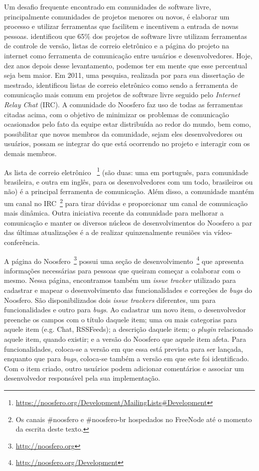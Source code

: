Um desafio frequente encontrado em comunidades de software livre, principalmente
comunidades de projetos menores ou novos, é elaborar um processo e utilizar
ferramentas que facilitem e incentivem a entrada de novas pessoas. 
 identificou que 65\% dos projetos de software livre
utilizam ferramentas de controle de versão, listas de correio eletrônico e a
página do projeto na internet como ferramenta de comunicação entre usuários e
desenvolvedores. Hoje, dez anos depois desse levantamento, podemos ter em mente
que esse percentual seja bem maior.
%
Em 2011, uma pesquisa, realizada por 
para sua dissertação de mestrado, identificou listas de correio eletrônico como
sendo a ferramenta de comunicação mais comum em projetos de software livre
seguido pelo \textit{Internet Relay Chat} (IRC).
%
A comunidade do Noosfero faz uso de todas as ferramentas citadas acima, com
o objetivo de minimizar os problemas de comunicação ocasionados pelo fato da
equipe estar distribuída ao redor do mundo, bem como, possibilitar que novos
membros da comunidade, sejam eles desenvolvedores ou usuários, possam se
integrar do que está ocorrendo no projeto e interagir com os demais membros.

As lista de correio eletrônico
~\footnote{\url{https://noosfero.org/Development/MailingLists\#Development}}
(são duas: uma em português, para comunidade brasileira, e outra em inglês,
para os desenvolvedores com um todo, brasileiros ou não) é a principal
ferramenta de comunicação. 
%
Além disso, a comunidade mantém um canal no IRC~\footnote{Os canais \#noosfero e
\#noosfero-br hospedados no FreeNode até o momento da escrita deste texto.}
para tirar dúvidas e proporcionar um canal de comunicação mais dinâmica.
%
Outra iniciativa recente da comunidade para melhorar a comunicação e manter os
diversos núcleos de desenvolvimentos do Noosfero a par das últimas atualizações
é a de realizar quinzenalmente reuniões via vídeo-conferência.

A página do Noosfero~\footnote{\url{http://noosfero.org}} possui uma seção de
desenvolvimento~\footnote{\url{http://noosfero.org/Development}} que apresenta
informações necessárias para pessoas que queiram começar a colaborar com o
mesmo. Nessa página, encontramos também um \textit{issue tracker} utilizado para
cadastrar e mapear o desenvolvimento das funcionalidades e correções de
\textit{bugs} do Noosfero.
%
São disponibilizados dois \textit{issue trackers} diferentes, um para
funcionalidades e outro para \textit{bugs}. Ao cadastrar um novo item, o
desenvolvedor preenche os campos com o título daquele item; uma ou mais
categorias para aquele item (e.g. Chat, RSSFeeds); a descrição daquele
item; o \textit{plugin} relacionado aquele item, quando existir; e a
versão do Noosfero que aquele item afeta.
%
Para funcionalidades, coloca-se a
versão em que essa está prevista para ser lançada, enquanto que para
\textit{bugs}, coloca-se também a versão em que este foi identificado. Com o
item criado, outro usuários podem adicionar comentários e associar um
desenvolvedor responsável pela sua implementação.

